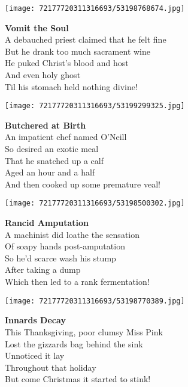 \documentclass[10pt,letterpaper]{article}
\begin{document}
\begin{center}
\texttt{[image: 72177720311316693/53198768674.jpg]}
\end{center}

\begin{center}
\textbf{Vomit the Soul}\\
\vskip 0.2in
A debauched priest claimed that he felt fine\\
But he drank too much sacrament wine\\
He puked Christ's blood and host\\
And even holy ghost\\
Til his stomach held nothing divine!\\
\end{center}
\pagebreak

\begin{center}\texttt{[image: 72177720311316693/53199299325.jpg]}
\end{center}
\begin{center}
\textbf{Butchered at Birth}\\
\vskip 0.2in
An impatient chef named O'Neill\\
So desired an exotic meal\\
That he snatched up a calf\\
Aged an hour and a half\\
And then cooked up some premature veal!\\
\end{center}
\pagebreak

\begin{center}\texttt{[image: 72177720311316693/53198500302.jpg]}
\end{center}
\begin{center}
\textbf{Rancid Amputation}\\
\vskip 0.2in
A machinist did loathe the sensation\\
Of soapy hands post-amputation\\
So he'd scarce wash his stump\\
After taking a dump\\
Which then led to a rank fermentation!\\
\end{center}
\pagebreak

\begin{center}\texttt{[image: 72177720311316693/53198770389.jpg]}
\end{center}
\begin{center}
\textbf{Innards Decay}\\
\vskip 0.2in
This Thanksgiving, poor clumsy Miss Pink\\
Lost the gizzards bag behind the sink\\
Unnoticed it lay\\
Throughout that holiday\\
But come Christmas it started to stink!\\
\end{center}
\pagebreak
\end{document}
